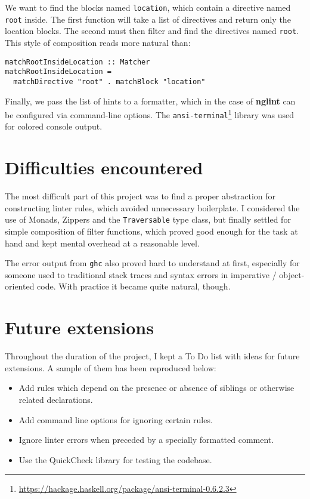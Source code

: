 \documentclass[]{article}
\providecommand{\tightlist}{%
  \setlength{\itemsep}{0pt}\setlength{\parskip}{0pt}}
\begin{document}
We want to find the blocks named \texttt{location}, which contain a directive
named \texttt{root} inside. The first function will take a list of directives
and return only the location blocks. The second must then filter and find
the directives named \texttt{root}. This style of composition reads more
natural than:

\begin{lstlisting}[basicstyle=\ttfamily]
matchRootInsideLocation :: Matcher
matchRootInsideLocation =
  matchDirective "root" . matchBlock "location"
\end{lstlisting}

Finally, we pass the list of hints to a formatter, which in the case of
\textbf{nglint} can be configured via command-line options. The
\texttt{ansi-terminal}\footnote{\url{https://hackage.haskell.org/package/ansi-terminal-0.6.2.3}}
library was used for colored console output.

\section{Difficulties encountered}\label{difficulties-encountered}

The most difficult part of this project was to find a proper abstraction
for constructing linter rules, which avoided unnecessary boilerplate. I
considered the use of Monads, Zippers and the \texttt{Traversable} type
class, but finally settled for simple composition of filter functions,
which proved good enough for the task at hand and kept mental overhead
at a reasonable level.

The error output from \texttt{ghc} also proved hard to understand at
first, especially for someone used to traditional stack traces and
syntax errors in imperative / object-oriented code. With practice it
became quite natural, though.

\section{Future extensions}\label{future-extensions}

Throughout the duration of the project, I kept a To Do list with ideas
for future extensions. A sample of them has been reproduced below:

\begin{itemize}
\tightlist
\item
  Add rules which depend on the presence or absence of siblings or
  otherwise related declarations.
\item
  Add command line options for ignoring certain rules.
\item
  Ignore linter errors when preceded by a specially formatted comment.
\item
  Use the QuickCheck library for testing the codebase.
\end{itemize}
\end{document}
